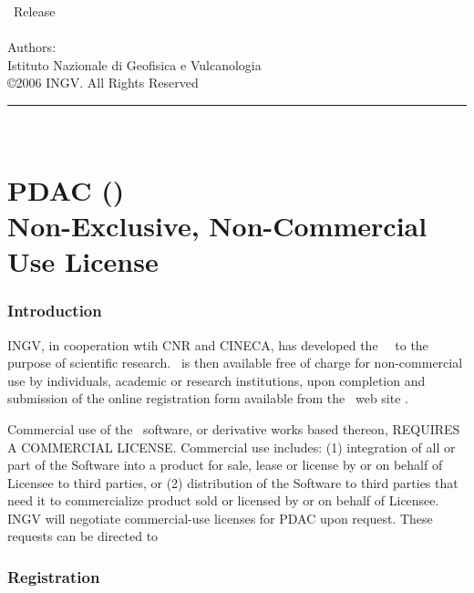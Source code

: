 
\thispagestyle{empty}

\vspace*{0.1in}

\begin{centering}
{\LARGE \PDAC\ Release \RELEASEVERSION}\\
{\Large \PDACNOTES}\\
\bigskip
{\large Authors: \UGAUTHORS} \\
\medskip
{\large Istituto Nazionale di Geofisica e Vulcanologia } \\
\bigskip
{\large \copyright 2006 INGV.
All Rights Reserved} \\
\bigskip
\end{centering}

  \rule{6in}{0.04in}				\\	\vspace{0.25in}

\section*{PDAC (\PDACNAME )\\
Non-Exclusive, Non-Commercial Use License}

\subsubsection*{Introduction}

INGV, in cooperation wtih CNR and CINECA,
has developed the \PDACNAME\ \PDAC\
to the purpose of scientific research.
\PDAC\ is then available free of charge for
non-commercial use by individuals, academic or research institutions,
upon completion and submission of the online registration form available 
from the \PDAC\ web site \PDACURL.

Commercial use of the \PDAC\ software, or derivative works based thereon,
REQUIRES A COMMERCIAL LICENSE. Commercial use includes: 
(1) integration of all or part of the Software into a product for sale, 
lease or license by or on behalf of Licensee to third parties, or 
(2) distribution of the Software to third parties that need it to 
commercialize product sold or licensed by or on behalf of Licensee.  
INGV will negotiate commercial-use licenses for PDAC upon request. 
These requests can be directed to \PDACADDRESS

\subsubsection*{Registration}

